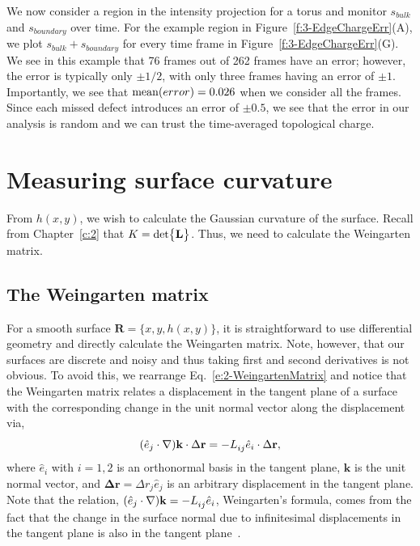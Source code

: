 We now consider a region in the intensity projection for a torus and monitor  $s_{bulk}$ and $s_{boundary}$ over time.
For the example region in Figure~\ref{f:3-EdgeChargeErr}(A), we plot $s_{bulk}+s_{boundary}$ for every time frame in Figure~\ref{f:3-EdgeChargeErr}(G).
We see in this example that 76 frames out of 262 frames have an error; however, the error is typically only $\pm 1/2$, with only three frames having an error of $\pm 1$.
Importantly, we see that ${\rm mean}(error) = 0.026$ when we consider all the frames.
Since each missed defect introduces an error of $\pm 0.5$, we see that the error in our analysis is random and we can trust the time-averaged topological charge.




\section{Measuring surface curvature}
From $h(x,y)$, we wish to calculate the Gaussian curvature of the surface.
Recall from Chapter~\ref{c:2} that $K = \textup{det} \big \{ \mathbf{L} \big \}$.
Thus, we need to calculate the Weingarten matrix.


\subsection{The Weingarten matrix}
For a smooth surface $\mathbf{R} = \{x, y, h(x,y)\}$, it is straightforward to use differential geometry and directly calculate the Weingarten matrix.
Note, however, that our surfaces are discrete and noisy and thus taking first and second derivatives is not obvious.
To avoid this, we rearrange Eq.~\ref{e:2-WeingartenMatrix} and notice that the Weingarten matrix relates a displacement in the tangent plane of a surface with the corresponding change in the unit normal vector along the displacement via,
\begin{equation}
(\hat{e}_j \cdot \nabla) \mathbf{k} \cdot \Delta \mathbf{r} = -\tensor{L}{_{ij}} \hat{e}_i \cdot \Delta \mathbf{r},\label{e:3-Kfit1}
\end{equation}
where $\hat{e}_i$ with $i = 1,2$ is an orthonormal basis in the tangent plane, $\mathbf{k}$ is the unit normal vector, and  $\mathbf{\Delta r} = \Delta r_j \hat{e}_j$ is an arbitrary displacement in the tangent plane.
Note that the relation, $(\hat{e}_j \cdot \nabla) \mathbf{k} = -\tensor{L}{_{ij}} \hat{e}_i$, Weingarten's formula, comes from the fact that the change in the surface normal due to infinitesimal displacements in the tangent plane is also in the tangent plane~\cite{RN35}.

